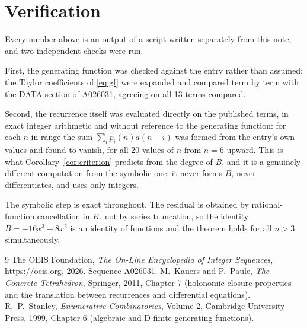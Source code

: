 \documentclass[11pt,a4paper]{article}
\theoremstyle{plain}
\theoremstyle{definition}
\begin{document}
\section{Verification}

Every number above is an output of a script written separately from this note, and two
independent checks were run.

First, the generating function was checked against the entry rather than assumed: the
Taylor coefficients of \eqref{eq:gf} were expanded and compared term by term with the DATA
section of A026031, agreeing on all 13 terms compared.

Second, the recurrence itself was evaluated directly on the published terms, in exact
integer arithmetic and without reference to the generating function: for each $n$ in range
the sum $\sum_{i}p_{i}(n)a(n-i)$ was formed from the entry's own values and found to
vanish, for all 20 values of $n$ from $n=6$ upward. This is what
Corollary~\ref{cor:criterion} predicts from the degree of $B$, and it is a genuinely
different computation from the symbolic one: it never forms $B$, never differentiates, and
uses only integers.

The symbolic step is exact throughout. The residual is obtained by rational-function
cancellation in $K$, not by series truncation, so the identity $B=- 16 x^{3} + 8 x^{2}$ is an
identity of functions and the theorem holds for all $n>3$ simultaneously.

\begin{thebibliography}{9}
 The OEIS Foundation, \emph{The On-Line Encyclopedia of Integer Sequences},
\url{https://oeis.org}, 2026. Sequence A026031.
 M.~Kauers and P.~Paule, \emph{The Concrete Tetrahedron}, Springer, 2011,
Chapter 7 (holonomic closure properties and the translation between recurrences and
differential equations).
 R.~P.~Stanley, \emph{Enumerative Combinatorics}, Volume 2, Cambridge
University Press, 1999, Chapter 6 (algebraic and D-finite generating functions).
\end{thebibliography}
\end{document}
